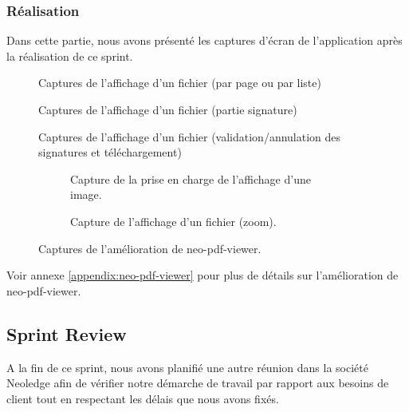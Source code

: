 \subsubsection{Réalisation}

Dans cette partie, nous avons présenté les captures d'écran de l'application après la réalisation de ce sprint.

\begin{figure}[H]
  \centering
  \caption{Captures de l'affichage d'un fichier (par page ou par liste)}
  \label{fig:realisation_file_1}
\end{figure}
\begin{figure}[H]
  \centering
  \caption{Captures de l'affichage d'un fichier (partie signature)}
  \label{fig:realisation_file_2}
\end{figure}
\begin{figure}[H]
  \centering
  \caption{Captures de l'affichage d'un fichier (validation/annulation des signatures et téléchargement)}
  \label{fig:realisation_file_3}
\end{figure}

\begin{figure}[H]
  \begin{subfigure}[t]{0.4\textwidth}
  \centering
  \caption{Capture de la prise en charge de l'affichage d'une image.}
  \label{fig:prendre_en_charge_image}
  \end{subfigure}\hfill
  \begin{subfigure}[t]{0.4\textwidth}
  \centering
  \caption{Capture de l'affichage d'un fichier (zoom).}
  \label{fig:zoom}
  \end{subfigure}
  \caption{Captures de l'amélioration de neo-pdf-viewer.}
\label{fig:zoom_and_image}
\end{figure}

Voir annexe \ref{appendix:neo-pdf-viewer} pour plus de détails sur l'amélioration de neo-pdf-viewer.


\subsection{Sprint Review}


A la fin de ce sprint, nous avons planifié une autre réunion dans la société Neoledge  afin de vérifier notre démarche de travail par rapport aux besoins de client  tout en respectant les délais que nous avons fixés.

